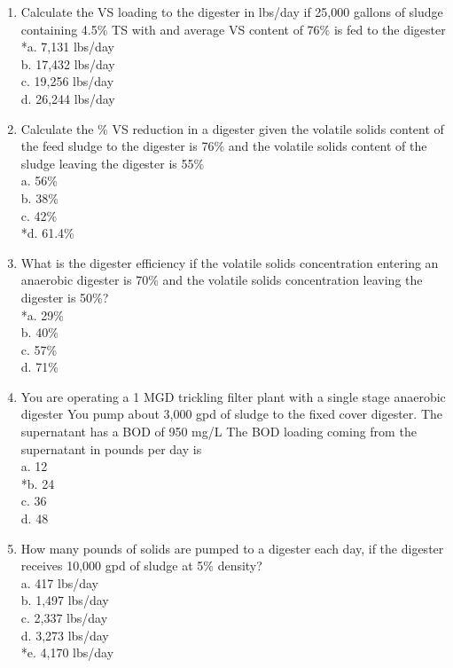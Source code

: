\documentclass{article}
\begin{document}
\begin{enumerate}
\item  Calculate the VS loading to the digester in lbs/day if 25,000 gallons of sludge containing 4.5\% TS with and average VS content of 76\% is fed to the digester \\

*a. 7,131 lbs/day \\
b. 17,432 lbs/day \\
c. 19,256 lbs/day \\
d. 26,244 lbs/day \\

\item  Calculate the \% VS reduction in a digester given the volatile solids content of the feed sludge to the digester is 76\% and the volatile solids content of the sludge leaving the digester is 55\% \\

a. 56\% \\
b. 38\% \\
c. 42\% \\
*d. 61.4\% \\

\item  What is the digester efficiency if the volatile solids concentration entering an anaerobic digester is 70\% and the volatile solids concentration leaving the digester is 50\%? \\

*a. 29\% \\
b. 40\% \\
c. 57\% \\
d. 71\% \\

\item  You are operating a 1 MGD trickling filter plant with a single stage anaerobic digester You pump about 3,000 gpd of sludge to the fixed cover digester.  The supernatant has a BOD of 950 mg/L The BOD loading coming from the supernatant in pounds per day is \\

a. 12 \\
*b. 24 \\
c. 36 \\
d. 48 \\

\item  How many pounds of solids are pumped to a digester each day, if the digester receives 10,000 gpd of sludge at 5\% density? \\

a. 417 lbs/day \\
b. 1,497 lbs/day \\
c. 2,337 lbs/day \\
d. 3,273 lbs/day \\
*e. 4,170 lbs/day \\


\end{enumerate}
\end{document}

